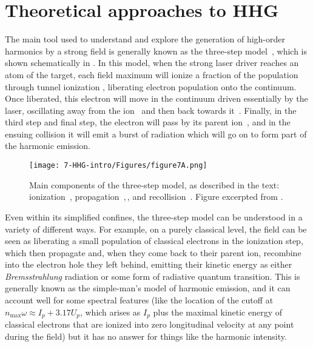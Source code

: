 \section{Theoretical approaches to HHG}
\label{sec:hhg-intro-intro}


The main tool used to understand and explore the generation of high-order harmonics by a strong field is generally known as the three-step model~\cite{corkum_plasma-perspective_1993, LewensteinHHG}, which is shown schematically in . In this model, when the strong laser driver reaches an atom of the target, each field maximum will ionize a fraction of the population through tunnel ionization , liberating electron population onto the continuum. Once liberated, this electron will move in the continuum driven essentially by the laser, oscillating away from the ion~ and then back towards it~. Finally, in the third step and final step, the electron will pass by its parent ion~, and in the ensuing collision it will emit a burst of radiation which will go on to form part of the harmonic emission.




\begin{figure}[htb]
  \centering
  \subfigure{\label{f7-corkum-three-step-model-a}}
  \subfigure{\label{f7-corkum-three-step-model-b}}
  \subfigure{\label{f7-corkum-three-step-model-c}}
  \subfigure{\label{f7-corkum-three-step-model-d}}
  \texttt{[image: 7-HHG-intro/Figures/figure7A.png]}
  \caption[
  Essential components of the three-step model of HHG
  ]{
  Main components of the three-step model, as described in the text: ionization~\protect{}, propagation~\protect{},\,\protect{}, and recollision~\protect{}.
  Figure excerpted from .
  }
\label{f7-corkum-three-step-model}
\end{figure}


Even within its simplified confines, the three-step model can be understood in a variety of different ways. For example, on a purely classical level, the field can be seen as liberating a small population of classical electrons in the ionization step, which then propagate and, when they come back to their parent ion, recombine into the electron hole they left behind, emitting their kinetic energy as either \textit{Bremsstrahlung} radiation or some form of radiative quantum transition. This is generally known as the simple-man's model of harmonic emission, and it can account well for some spectral features (like the location of the cutoff at $n_\mathrm{max}\omega\approx I_p+3.17U_p$, which arises as $I_p$ plus the maximal kinetic energy of classical electrons that are ionized into zero longitudinal velocity at any point during the field) but it has no answer for things like the harmonic intensity.


